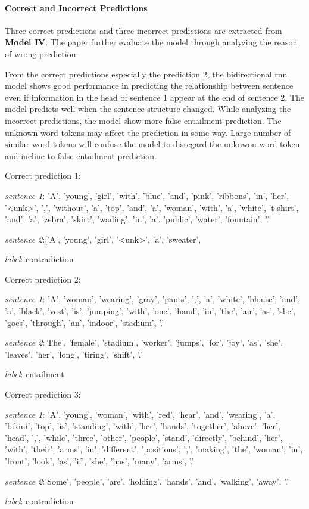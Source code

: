 \documentclass[10pt]{article}
\begin{document}
\paragraph{Correct and Incorrect Predictions}
Three correct predictions and three incorrect predictions are extracted from \textbf{Model IV}. The paper further evaluate the model through analyzing the reason of wrong prediction.\par
From the correct predictions especially the prediction 2, the bidirectional rnn model shows good performance in predicting the relationship between sentence even if information in the head of sentence 1 appear at the end of sentence 2. The model predicts well when the sentence structure changed.
While analyzing the incorrect predictions, the model show more false entailment prediction.  The unknown word tokens may affect the prediction in some way. Large number of similar word tokens will confuse the model to disregard the unknwon word token and incline to false entailment prediction.


Correct prediction 1:\par
\textit{sentence 1}: 'A', 'young', 'girl', 'with', 'blue', 'and', 'pink', 'ribbons', 'in', 'her', '<unk>', ',', 'without', 'a', 'top', 'and', 'a', 'woman', 'with', 'a', 'white', 't-shirt', 'and', 'a', 'zebra', 'skirt', 'wading', 'in', 'a', 'public', 'water', 'fountain', '.'\par
\textit{sentence 2}:['A', 'young', 'girl', '<unk>', 'a', 'sweater', \par
\textit{label}: contradiction

Correct prediction 2:\par
\textit{sentence 1}: 'A', 'woman', 'wearing', 'gray', 'pants', ',', 'a', 'white', 'blouse', 'and', 'a', 'black', 'vest', 'is', 'jumping', 'with', 'one', 'hand', 'in', 'the', 'air', 'as', 'she', 'goes', 'through', 'an', 'indoor', 'stadium', '.'\par
\textit{sentence 2}:'The', 'female', 'stadium', 'worker', 'jumps', 'for', 'joy', 'as', 'she', 'leaves', 'her', 'long', 'tiring', 'shift', '.'\par
\textit{label}: entailment\par
Correct prediction 3:\par
\textit{sentence 1}: 'A', 'young', 'woman', 'with', 'red', 'hear', 'and', 'wearing', 'a', 'bikini', 'top', 'is', 'standing', 'with', 'her', 'hands', 'together', 'above', 'her', 'head', ',', 'while', 'three', 'other', 'people', 'stand', 'directly', 'behind', 'her', 'with', 'their', 'arms', 'in', 'different', 'positions', ',', 'making', 'the', 'woman', 'in', 'front', 'look', 'as', 'if', 'she', 'has', 'many', 'arms', '.'\par
\textit{sentence 2}:'Some', 'people', 'are', 'holding', 'hands', 'and', 'walking', 'away', '.'\par
\textit{label}: contradiction\par
\end{document}

